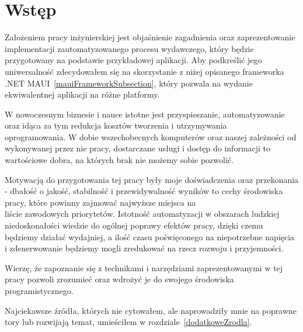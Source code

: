 \section{Wstęp}

Założeniem pracy inżynierskiej jest objaśnienie zagadnienia oraz zaprezentowanie 
implementacji zautomatyzowanego procesu wydawczego, który będzie 
przygotowany na podstawie przykładowej aplikacji. 
Aby podkreślić jego uniwersalność zdecydowałem się na skorzystanie z niżej opisanego frameworka 
.NET MAUI~\ref{mauiFrameworkSubsection}, który pozwala na wydanie ekwiwalentnej aplikacji na różne platformy.

W nowoczesnym biznesie i nauce istotne jest przyspieszanie, automatyzowanie 
oraz idąca za tym redukcja kosztów tworzenia i utrzymywania \\oprogramowania.
W dobie wszechobecnych komputerów oraz naszej zależności od wykonywanej przez 
nie pracy, dostarczane usługi i dostęp do informacji to wartościowe dobra, 
na których brak nie możemy sobie pozwolić.

Motywacją do przygotowania tej pracy były moje doświadczenia oraz przekonania - 
dbałość o jakość, stabilność i przewidywalność wyników to cechy środowiska pracy, 
które powinny zajmować najwyższe miejsca na \\liście zawodowych priorytetów.
Istotność automatyzacji w obszarach ludzkiej niedoskonałości wiedzie do 
ogólnej poprawy efektów pracy, dzięki czemu będziemy działać wydajniej, 
a ilość czasu poświęconego na niepotrzebne napięcia i zdenerwowanie będziemy mogli 
zredukować na rzecz rozwoju i przyjemności.

Wierzę, że zapoznanie się z technikami i narzędziami zaprezentowanymi w tej pracy 
pozwoli zrozumieć oraz wdrożyć je do swojego środowiska programistycznego.

Najciekawsze źródła, których nie cytowałem, ale naprowadziły mnie na poprawne tory lub rozwijają temat, 
umieściłem w rozdziale~\ref{dodatkoweZrodla}.

